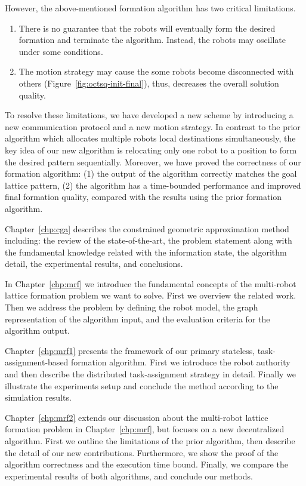 However, the above-mentioned formation algorithm has two critical limitations.
\begin{enumerate}
\item There is no guarantee that the robots will eventually form the
  desired formation and terminate the algorithm. 
  Instead, the robots may oscillate under some conditions.
\item The motion strategy may cause the some robots become
  disconnected with others (Figure~\ref{fig:octsq-init-final}), 
  thus, decreases the overall solution quality.
\end{enumerate}
To resolve these limitations, we have developed a new scheme by introducing a new communication protocol and a new motion strategy. 
In contrast to the prior algorithm which allocates multiple robots local destinations simultaneously,
the key idea of our new algorithm is relocating only one robot to a position to form the desired pattern sequentially.
Moreover, we have proved the correctness of our formation algorithm: (1) the
output of the algorithm correctly matches the goal lattice pattern, (2) the
algorithm has a time-bounded performance and improved final formation quality, 
compared with the results using the prior formation algorithm.

Chapter~\ref{chp:cga} describes the constrained geometric approximation method 
including: the review of the state-of-the-art,
the problem statement along with the fundamental knowledge related with the
information state, the algorithm detail, the experimental results, and conclusions.

In Chapter~\ref{chp:mrf} we introduce the fundamental concepts of the multi-robot lattice formation problem we want to solve. 
% 
First we overview the related work. 
%
Then we address the problem by defining the robot model, the graph representation of the algorithm input, and the evaluation criteria for the algorithm output. 

Chapter~\ref{chp:mrf1} presents the framework of our primary stateless, task-assignment-based formation algorithm. 
%
First we introduce the robot authority and then describe the distributed task-assignment strategy in detail.
%
Finally we illustrate the experiments setup and conclude the method according to the simulation results.

Chapter~\ref{chp:mrf2} extends our discussion about the multi-robot lattice formation problem in Chapter~\ref{chp:mrf}, but focuses on a new decentralized algorithm. 
First we outline the limitations of the prior algorithm, then describe the detail of our new contributions.
Furthermore, we show the proof of the algorithm correctness and the execution time bound.
Finally, we compare the experimental results of both algorithms, and conclude our methods.